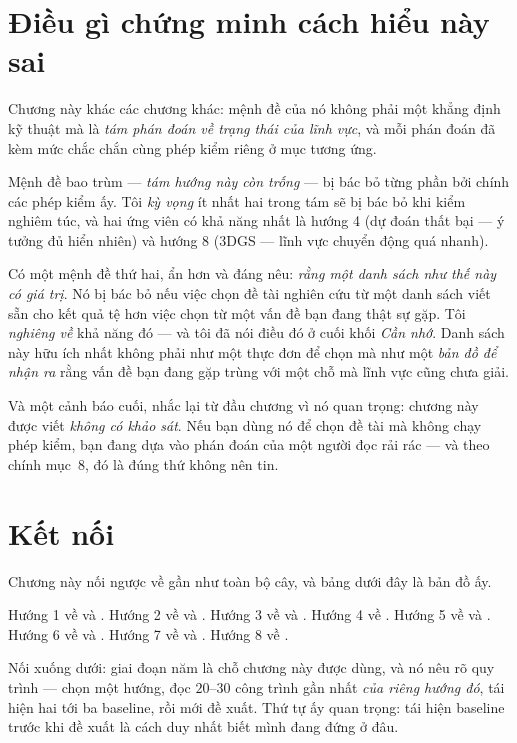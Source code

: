 \documentclass[../../vslam.tex]{subfiles}
\begin{document}
\section{Điều gì chứng minh cách hiểu này sai}

Chương này khác các chương khác: mệnh đề của nó không phải một khẳng định kỹ thuật mà là \emph{tám phán đoán về trạng thái của lĩnh vực}, và mỗi phán đoán đã kèm mức chắc chắn cùng phép kiểm riêng ở mục tương ứng.

Mệnh đề bao trùm --- \emph{tám hướng này còn trống} --- bị bác bỏ từng phần bởi chính các phép kiểm ấy. Tôi \emph{kỳ vọng} ít nhất hai trong tám sẽ bị bác bỏ khi kiểm nghiêm túc, và hai ứng viên có khả năng nhất là hướng 4 (dự đoán thất bại --- ý tưởng đủ hiển nhiên) và hướng 8 (3DGS --- lĩnh vực chuyển động quá nhanh).

Có một mệnh đề thứ hai, ẩn hơn và đáng nêu: \emph{rằng một danh sách như thế này có giá trị}. Nó bị bác bỏ nếu việc chọn đề tài nghiên cứu từ một danh sách viết sẵn cho kết quả tệ hơn việc chọn từ một vấn đề bạn đang thật sự gặp. Tôi \emph{nghiêng về} khả năng đó --- và tôi đã nói điều đó ở cuối khối \emph{Cần nhớ}. Danh sách này hữu ích nhất không phải như một thực đơn để chọn mà như một \emph{bản đồ để nhận ra} rằng vấn đề bạn đang gặp trùng với một chỗ mà lĩnh vực cũng chưa giải.

Và một cảnh báo cuối, nhắc lại từ đầu chương vì nó quan trọng: chương này được viết \emph{không có khảo sát}. Nếu bạn dùng nó để chọn đề tài mà không chạy phép kiểm, bạn đang dựa vào phán đoán của một người đọc rải rác --- và theo chính  mục~8, đó là đúng thứ không nên tin.

\section{Kết nối}

Chương này nối ngược về gần như toàn bộ cây, và bảng dưới đây là bản đồ ấy.

Hướng 1 về  và . Hướng 2 về  và . Hướng 3 về  và . Hướng 4 về . Hướng 5 về  và . Hướng 6 về  và . Hướng 7 về  và . Hướng 8 về .

Nối xuống dưới:  giai đoạn năm là chỗ chương này được dùng, và nó nêu rõ quy trình --- chọn một hướng, đọc \(20\)--\(30\) công trình gần nhất \emph{của riêng hướng đó}, tái hiện hai tới ba baseline, rồi mới đề xuất. Thứ tự ấy quan trọng: tái hiện baseline trước khi đề xuất là cách duy nhất biết mình đang đứng ở đâu.
\end{document}
